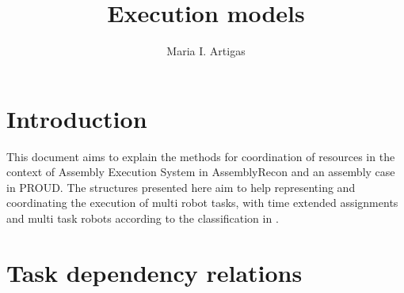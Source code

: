 \documentclass[a4paper,10pt]{article}
\begin{document}
\title{Execution models}
\author{Maria I. Artigas}



\maketitle



\begin{abstract}

\end{abstract}






\section{Introduction}

This document aims to explain the methods for coordination of resources in the context of Assembly Execution System in AssemblyRecon and an assembly case in PROUD. The structures presented here aim to help representing and coordinating the execution of multi robot tasks,  with time extended assignments and multi task robots according to the classification in \cite{korsah2013comprehensive}. 


\section{Task dependency relations }
\end{document}
